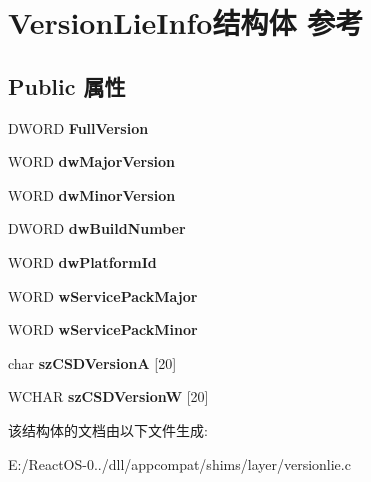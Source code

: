\hypertarget{struct_version_lie_info}{}\section{Version\+Lie\+Info结构体 参考}
\label{struct_version_lie_info}
\subsection*{Public 属性}
\begin{DoxyCompactItemize}
\item 
\mbox{\label{struct_version_lie_info_aa0513e702712b168f99069237db919a8}} 
D\+W\+O\+RD {\bfseries Full\+Version}
\item 
\mbox{\label{struct_version_lie_info_aa22493ae9fb16262dfb43c44e70c0eed}} 
W\+O\+RD {\bfseries dw\+Major\+Version}
\item 
\mbox{\label{struct_version_lie_info_aee2246d6bc4e566af15a86c49bb5dea3}} 
W\+O\+RD {\bfseries dw\+Minor\+Version}
\item 
\mbox{\label{struct_version_lie_info_a9bed9047e051f298b4a2c5344e42845d}} 
D\+W\+O\+RD {\bfseries dw\+Build\+Number}
\item 
\mbox{\label{struct_version_lie_info_a533b02637cd214e732188520b37bbf2e}} 
W\+O\+RD {\bfseries dw\+Platform\+Id}
\item 
\mbox{\label{struct_version_lie_info_a9ed1794e2780777b1896d2073ed0da76}} 
W\+O\+RD {\bfseries w\+Service\+Pack\+Major}
\item 
\mbox{\label{struct_version_lie_info_a6a3fea03333e12fd89891d063922d3f5}} 
W\+O\+RD {\bfseries w\+Service\+Pack\+Minor}
\item 
\mbox{\label{struct_version_lie_info_a8027c850d577e823c3f6063ffaba0bb3}} 
char {\bfseries sz\+C\+S\+D\+VersionA} \mbox{[}20\mbox{]}
\item 
\mbox{\label{struct_version_lie_info_ac80fd1b6b9f216f8d71dcd7ac3537409}} 
W\+C\+H\+AR {\bfseries sz\+C\+S\+D\+VersionW} \mbox{[}20\mbox{]}
\end{DoxyCompactItemize}


该结构体的文档由以下文件生成\+:\begin{DoxyCompactItemize}
\item 
E\+:/\+React\+O\+S-\/0../dll/appcompat/shims/layer/versionlie.\+c\end{DoxyCompactItemize}
